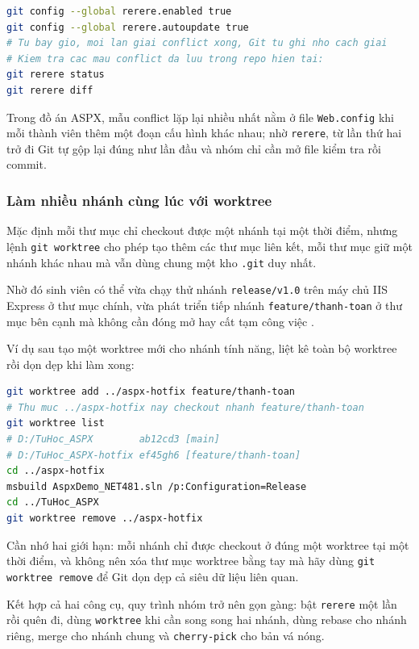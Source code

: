 \begin{lstlisting}[language=bash, caption={Bat rerere va kiem tra thu muc ghi nho}, label={lst:c32-rerere}]
git config --global rerere.enabled true
git config --global rerere.autoupdate true
# Tu bay gio, moi lan giai conflict xong, Git tu ghi nho cach giai
# Kiem tra cac mau conflict da luu trong repo hien tai:
git rerere status
git rerere diff
\end{lstlisting}

Trong đồ án ASPX, mẫu conflict lặp lại nhiều nhất nằm ở file \verb|Web.config| khi mỗi thành viên thêm một đoạn cấu hình khác nhau; nhờ \verb|rerere|, từ lần thứ hai trở đi Git tự gộp lại đúng như lần đầu và nhóm chỉ cần mở file kiểm tra rồi commit.

\subsubsection{Làm nhiều nhánh cùng lúc với worktree}

Mặc định mỗi thư mục chỉ checkout được một nhánh tại một thời điểm, nhưng lệnh \verb|git worktree| cho phép tạo thêm các thư mục liên kết, mỗi thư mục giữ một nhánh khác nhau mà vẫn dùng chung một kho \verb|.git| duy nhất.

Nhờ đó sinh viên có thể vừa chạy thử nhánh \verb|release/v1.0| trên máy chủ IIS Express ở thư mục chính, vừa phát triển tiếp nhánh \verb|feature/thanh-toan| ở thư mục bên cạnh mà không cần đóng mở hay cất tạm công việc \cite{atlassiangit}.

Ví dụ sau tạo một worktree mới cho nhánh tính năng, liệt kê toàn bộ worktree rồi dọn dẹp khi làm xong:

\begin{lstlisting}[language=bash, caption={Tao liet ke va don dep worktree}, label={lst:c32-worktree}]
git worktree add ../aspx-hotfix feature/thanh-toan
# Thu muc ../aspx-hotfix nay checkout nhanh feature/thanh-toan
git worktree list
# D:/TuHoc_ASPX        ab12cd3 [main]
# D:/TuHoc_ASPX-hotfix ef45gh6 [feature/thanh-toan]
cd ../aspx-hotfix
msbuild AspxDemo_NET481.sln /p:Configuration=Release
cd ../TuHoc_ASPX
git worktree remove ../aspx-hotfix
\end{lstlisting}

Cần nhớ hai giới hạn: mỗi nhánh chỉ được checkout ở đúng một worktree tại một thời điểm, và không nên xóa thư mục worktree bằng tay mà hãy dùng \verb|git worktree remove| để Git dọn dẹp cả siêu dữ liệu liên quan.

Kết hợp cả hai công cụ, quy trình nhóm trở nên gọn gàng: bật \verb|rerere| một lần rồi quên đi, dùng \verb|worktree| khi cần song song hai nhánh, dùng rebase cho nhánh riêng, merge cho nhánh chung và \verb|cherry-pick| cho bản vá nóng.
